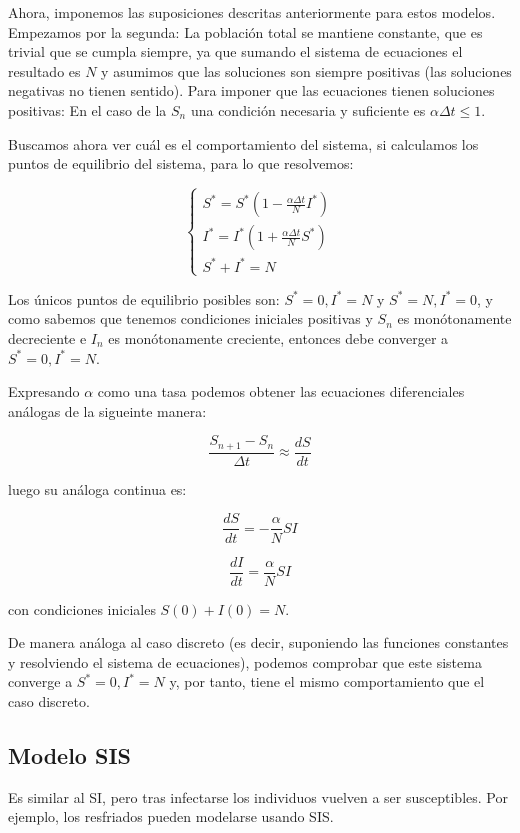 Ahora, imponemos las suposiciones descritas anteriormente para estos modelos. Empezamos por la segunda: La población total se mantiene constante, que es trivial que se cumpla siempre, ya que sumando el sistema de ecuaciones el resultado es $N$ y asumimos que las soluciones son siempre positivas (las soluciones negativas no tienen sentido).
Para imponer que las ecuaciones tienen soluciones positivas:
En el caso de la $S_n$ una condición necesaria y suficiente es $\alpha\Delta t \leq 1$. 

Buscamos ahora ver cuál es el comportamiento del sistema, si calculamos los puntos de equilibrio del sistema, para lo que resolvemos:

$$
\begin{cases}
S^*=S^*\left( 1-\frac{\alpha\Delta t}{N}I^*\right) \\
I^*=I^*\left( 1+\frac{\alpha\Delta t}{N}S^*\right) \\
S^*+I^*=N
\end{cases}
$$

Los únicos puntos de equilibrio posibles son: $S^*=0, I^*=N$ y $S^*=N, I^*=0$, y como sabemos que tenemos condiciones iniciales positivas y $S_n$ es monótonamente decreciente e $I_n$ es monótonamente creciente, entonces debe converger a $S^*=0, I^*=N$.

Expresando $\alpha$ como una tasa podemos obtener las ecuaciones diferenciales análogas de la sigueinte manera:

$$\frac{S_{n+1} - S_n}{\Delta t} \approx \frac{dS}{dt}$$

luego su análoga continua es:

\begin{equation}
\frac{dS}{dt} = -\frac{\alpha}{N}SI
\end{equation}


\begin{equation}
\frac{dI}{dt} = \frac{\alpha}{N}SI
\end{equation}

con condiciones iniciales $S(0)+I(0)=N$.

De manera análoga al caso discreto (es decir, suponiendo las funciones constantes y resolviendo el sistema de ecuaciones), podemos comprobar que este sistema converge a $S^*=0, I^*=N$ y, por tanto, tiene el mismo comportamiento que el caso discreto.

\subsection{Modelo SIS}
Es similar al SI, pero tras infectarse los individuos vuelven a ser susceptibles.
Por ejemplo, los resfriados pueden modelarse usando SIS.

